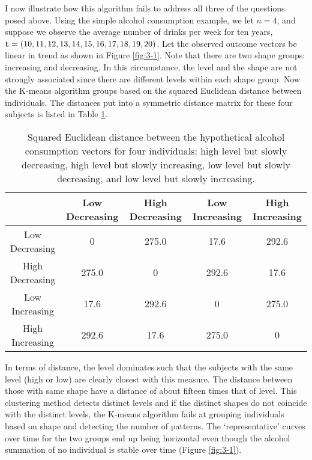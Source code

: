 I now illustrate how this algorithm fails to address all three of the questions posed above. Using the simple alcohol consumption example, we let $n=4$, and suppose we observe the average number of drinks per week for ten years, $\mathbf t=(10,11,12,13,14,15,16,17,18,19,20)$. Let the observed outcome vectors be linear in trend as shown in Figure \ref{fig:3-1}. Note that there are two shape groups: increasing and decreasing. In this circumstance, the level and the shape are not strongly associated since there are different levels within each shape group. Now the K-means algorithm groups based on the squared Euclidean distance between individuals. The distances put into a symmetric distance matrix for these four subjects is listed in Table \ref{tab:3-1}. 
\begin{table}[h]
\begin{center}
\begin{tabular}{c|cccc}
&Low Decreasing& High Decreasing&Low Increasing&High Increasing\\
\hline
Low Decreasing&0&275.0&17.6&292.6\\
High Decreasing&275.0  &0 &  292.6 &17.6 \\                     
Low Increasing& 17.6 &292.6  &0   &275.0   \\          
High Increasing& 292.6 &17.6 &275.0   &0 
\end{tabular}
\end{center}
\caption{Squared Euclidean distance between the hypothetical alcohol consumption vectors for four individuals: high level but slowly decreasing, high level but slowly increasing, low level but slowly decreasing, and low level but slowly increasing. }
\label{tab:3-1}
\end{table}
In terms of distance, the level dominates such that the subjects with the same level (high or low) are clearly closest with this measure. The distance between those with same shape have a distance of about fifteen times that of level. This clustering method detects distinct levels and if the distinct shapes do not coincide with the distinct levels, the K-means algorithm fails at grouping individuals based on shape and detecting the number of patterns. The `representative' curves over time for the two groups end up being horizontal even though the alcohol summation of no individual is stable over time (Figure \ref{fig:3-1}).\\

